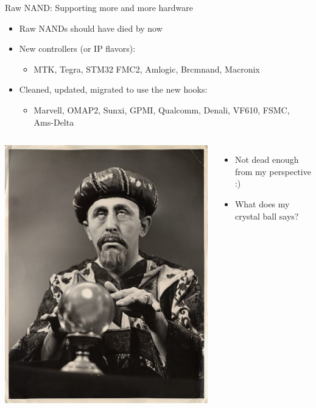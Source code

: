 \documentclass[aspectratio=169,obeyspaces,spaces,hyphens,dvipsnames]{beamer}
\begin{document}
\begin{frame}{Raw NAND: Supporting more and more hardware}
  \begin{itemize}
  \item Raw NANDs should have died by now
  \item New controllers (or IP flavors):
    \begin{itemize}
    \item MTK, Tegra, STM32 FMC2, Amlogic, Brcmnand, Macronix
    \end{itemize}
  \item Cleaned, updated, migrated to use the new hooks:
    \begin{itemize}
    \item Marvell, OMAP2, Sunxi, GPMI, Qualcomm, Denali, VF610, FSMC, Ams-Delta
    \end{itemize}
  \end{itemize}
  \vfill
  \begin{columns}
    \begin{center}
      \includegraphics[scale=0.5]{crystal-ball.jpg}
    \end{center}
    \begin{itemize}
    \item Not dead enough from my perspective :)
    \item What does my crystal ball says? %
    \end{itemize}
  \end{columns}
\end{frame}
\end{document}
